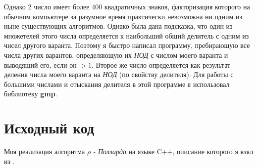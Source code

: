 \documentclass[pdf, unicode, 12pt, a4paper,oneside,fleqn]{article}
\begin{document}
Однако 2 число имеет более 400 квадратичных знаков, факторизация которого на обычном компьютере за разумное время практически невозможна ни одним из ныне существующих алгоритмов. Однако была дана подсказка, что один из множетелей этого числа определяется к наибольший общий делитель с одним из чисел другого варанта. Поэтому я быстро написал программу, пребирающую все числа других варантов, определяющую их {\it НОД} с числом моего варанта и выводящий его, если он $> 1$.
Второе же число определяется как результат деления числа моего варанта на {\it НОД} (по свойству делителя). Для работы с большими числами и отыскания делителя в этой программе я использовал библиотеку {\bfseries gmp}\cite{gmp}. \\




\pagebreak

\section{Исходный код}

Моя реализация алгоритма $\rho${ \it- Полларда} на языке C++, описание которого я взял из \cite{pol}.
\end{document}

